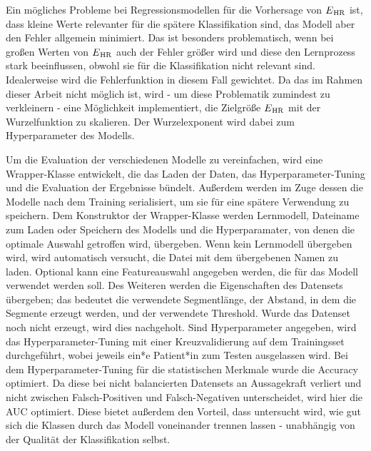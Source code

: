 Ein mögliches Probleme bei Regressionsmodellen für die Vorhersage von $E\textsubscript{HR}$ ist, dass kleine Werte relevanter für die spätere Klassifikation sind, das Modell aber den Fehler allgemein minimiert. Das ist besonders problematisch, wenn bei großen Werten von $E\textsubscript{HR}$ auch der Fehler größer wird und diese den Lernprozess stark beeinflussen, obwohl sie für die Klassifikation nicht relevant sind. Idealerweise wird die Fehlerfunktion in diesem Fall gewichtet. Da das im Rahmen dieser Arbeit nicht möglich ist, wird - um diese Problematik zumindest zu verkleinern - eine Möglichkeit implementiert, die Zielgröße $E\textsubscript{HR}$ mit der Wurzelfunktion zu skalieren. Der Wurzelexponent wird dabei zum Hyperparameter des Modells.


Um die Evaluation der verschiedenen Modelle zu vereinfachen, wird eine Wrapper-Klasse entwickelt, die das Laden der Daten, das Hyperparameter-Tuning und die Evaluation der Ergebnisse bündelt. Außerdem werden im Zuge dessen die Modelle nach dem Training serialisiert, um sie für eine spätere Verwendung zu speichern. Dem Konstruktor der Wrapper-Klasse werden Lernmodell, Dateiname zum Laden oder Speichern des Modells und die Hyperparamater, von denen die optimale Auswahl getroffen wird, übergeben. Wenn kein Lernmodell übergeben wird, wird automatisch versucht, die Datei mit dem übergebenen Namen zu laden. Optional kann eine Featureauswahl angegeben werden, die für das Modell verwendet werden soll. Des Weiteren werden die Eigenschaften des Datensets übergeben; das bedeutet die verwendete Segmentlänge, der Abstand, in dem die Segmente erzeugt werden, und der verwendete Threshold. Wurde das Datenset noch nicht erzeugt, wird dies nachgeholt. Sind Hyperparameter angegeben, wird das Hyperparameter-Tuning mit einer Kreuzvalidierung auf dem Trainingsset durchgeführt, wobei jeweils ein*e Patient*in zum Testen ausgelassen wird. Bei dem Hyperparameter-Tuning für die statistischen Merkmale wurde die Accuracy optimiert. Da diese bei nicht balancierten Datensets an Aussagekraft verliert und nicht zwischen Falsch-Positiven und Falsch-Negativen unterscheidet, wird hier die \ac{AUC} optimiert. Diese bietet außerdem den Vorteil, dass untersucht wird, wie gut sich die Klassen durch das Modell voneinander trennen lassen - unabhängig von der Qualität der Klassifikation selbst.



